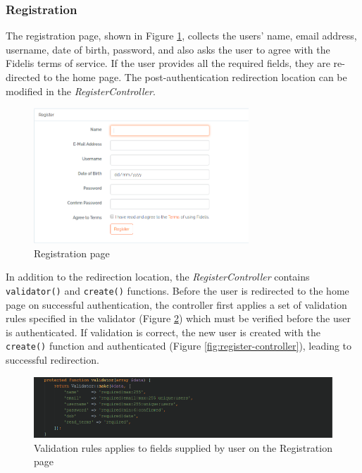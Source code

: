 \subsubsection{Registration}
The registration page, shown in Figure \ref{fig:RegisterPage}, collects the users' name, email address, username, date of birth, password, and also asks the user to agree with the Fidelis terms of service. If the user provides all the required fields, they are re-directed to the home page. The post-authentication redirection location can be modified in the \textit{RegisterController}.

\begin{figure}[H]
\centering
\includegraphics[height=2in]{Images/Design/register-page}
\caption{Registration page}
\label{fig:RegisterPage}
\end{figure}

In addition to the redirection location, the \textit{RegisterController} contains \texttt{validator()} and \texttt{create()} functions. Before the user is redirected to the home page on successful authentication, the controller first applies a set of validation rules specified in the validator (Figure \ref{fig:RegValidation}) which must be verified before the user is authenticated. If validation is correct, the new user is created with the \texttt{create()} function and authenticated (Figure \ref{fig:register-controller}), leading to successful redirection.

\begin{figure}[H]
\centering
\includegraphics[width=\textwidth]{Images/Implementation/RegisterValidation}
\caption{Validation rules applies to fields supplied by user on the Registration page}
\label{fig:RegValidation}
\end{figure}

